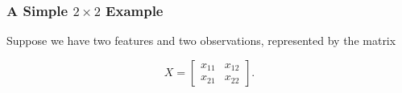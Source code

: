 \documentclass[11pt]{article}
\begin{document}

\subsubsection*{A Simple $2\times 2$ Example}

Suppose we have two features and two
observations, represented by the matrix

\[
X=
\begin{bmatrix}
x_{11} & x_{12}\\
x_{21} & x_{22}
\end{bmatrix}.
\]
\end{document}
